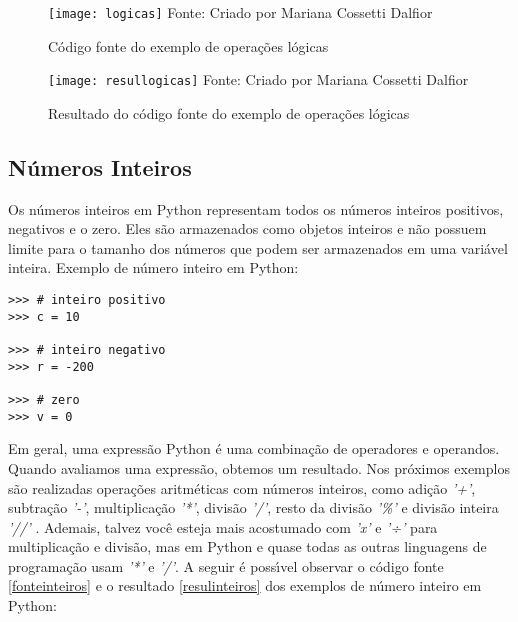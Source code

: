 \begin{figure}[H]
	\begin{center}
		\caption{C\'{o}digo fonte do exemplo de opera\c{c}\~{o}es l\'{o}gicas} \label{fontelogicas}
		\texttt{[image: logicas]} 
		\newline
		Fonte: Criado por Mariana Cossetti Dalfior
	\end{center}
\end{figure}

\begin{figure}[H]
	\begin{center}
		\caption{Resultado do c\'{o}digo fonte do exemplo de opera\c{c}\~{o}es l\'{o}gicas} \label{resullogicas}
		\texttt{[image: resullogicas]} 
		\newline
		Fonte: Criado por Mariana Cossetti Dalfior
	\end{center}
\end{figure}

		\subsection{N\'{u}meros Inteiros}
Os n\'{u}meros inteiros em Python representam todos os n\'{u}meros inteiros positivos, negativos e o zero. Eles s\~{a}o armazenados como objetos inteiros e n\~{a}o possuem limite para o tamanho dos n\'{u}meros que podem ser armazenados em uma vari\'{a}vel inteira. 
Exemplo de n\'{u}mero inteiro em Python:

\begin{lstlisting}
>>> # inteiro positivo
>>> c = 10

>>> # inteiro negativo
>>> r = -200

>>> # zero
>>> v = 0
\end{lstlisting}

Em geral, uma express\~{a}o Python \'{e} uma combina\c{c}\~{a}o de operadores e operandos. Quando avaliamos uma express\~{a}o, obtemos um resultado. Nos pr\'{o}ximos exemplos s\~{a}o realizadas opera\c{c}\~{o}es aritm\'{e}ticas com n\'{u}meros inteiros, como adi\c{c}\~{a}o \textsl{'+'}, subtra\c{c}\~{a}o \textsl{'-'}, multiplica\c{c}\~{a}o \textsl{'*'}, divis\~{a}o \textsl{'/'}, resto da divis\~{a}o \textsl{'\%'} e divis\~{a}o inteira \textsl{'//'} . Ademais, talvez voc\^{e} esteja mais acostumado com \textsl{'x'} e \textsl{'÷'} para multiplica\c{c}\~{a}o e divis\~{a}o, mas em Python e quase todas as outras linguagens de programa\c{c}\~{a}o usam \textsl{'*'} e \textsl{'/'}.  A seguir \'{e} poss\'{\i}vel observar o c\'{o}digo fonte \ref{fonteinteiros} e o resultado \ref{resulinteiros} dos exemplos de n\'{u}mero inteiro em Python:

